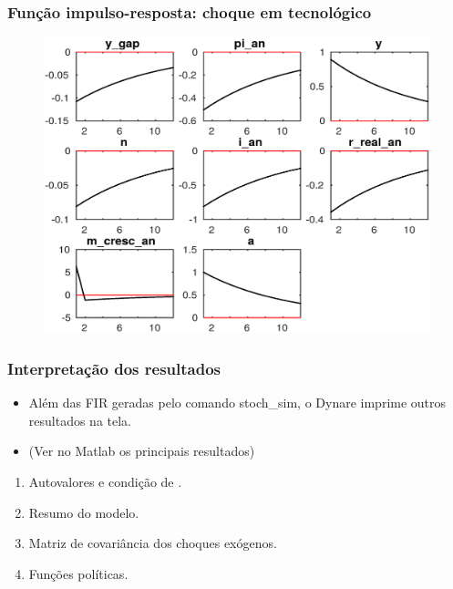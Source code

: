 \documentclass[xcolor=pdftex,dvipsnames,table]{beamer}
\newcommand{\ft}{\frametitle}
\begin{document}
\begin{frame}
\ft{Função impulso-resposta: choque em tecnológico}

\begin{figure}[h!]
\includegraphics[scale=0.35]{fig32.eps}
\label{fig1}
\end{figure}

\end{frame}


\begin{frame}[fragile]
\ft{Interpretação dos resultados}

\begin{itemize}

\item Além das FIR geradas pelo comando stoch\_sim, o Dynare imprime outros resultados na tela.

\item (Ver no Matlab os principais resultados)

\end{itemize}

\begin{enumerate}

\item Autovalores e condição de .

\item Resumo do modelo.

\item Matriz de covariância dos choques exógenos.

\item Funções políticas.

\end{enumerate}
\end{frame}
\end{document}
